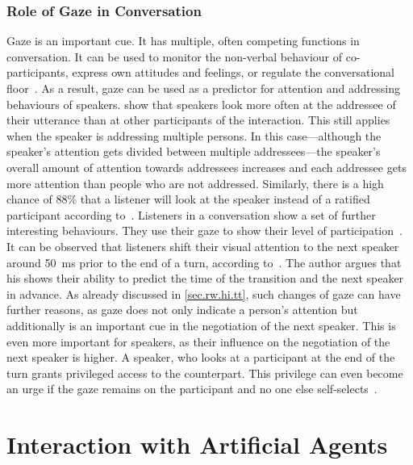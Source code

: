 \subsubsection{Role of Gaze in Conversation}\label{sec.rw.hi.gaze}

Gaze is an important  cue.
It has multiple, often competing functions in \gls{conversation}.
It can be used to monitor the non-verbal behaviour of co-participants, express own attitudes and feelings, or regulate the \gls{conversational floor}~\cite[]{Kendon1967}.
As a result, gaze can be used as a predictor for  attention and addressing behaviours of \glspl{speaker}.
 show that \glspl{speaker} look more often at the \gls{addressee} of their utterance than at other participants of the interaction.
This still applies when the \gls{speaker} is addressing multiple persons.
In this case---although the \gls{speaker}'s attention gets divided between multiple \glspl{addressee}---the \gls{speaker}'s overall amount of attention towards \glspl{addressee} increases and each \gls{addressee} gets more attention than people who are not addressed.
Similarly, there is a high chance of 88\% that a listener will look at the \gls{speaker} instead of a ratified participant according to~.
Listeners in a \gls{conversation} show a set of further interesting behaviours.
They use their gaze to show their level of participation~\cite[]{Auer2017}.
It can be observed that listeners shift their visual attention to the next \gls{speaker} around \SI{50}{\ms} prior to the end of a \gls{turn}, according to~.
The author argues that his shows their ability to predict the time of the transition and the next \gls{speaker} in advance.
As already discussed in \ref{sec.rw.hi.tt}, such changes of gaze can have further reasons, as gaze does not only indicate a person's attention but additionally is an important cue in the negotiation of the next \gls{speaker}.
This is even more important for \glspl{speaker}, as their influence on the negotiation of the next \gls{speaker} is higher.
A \gls{speaker}, who looks at a participant at the end of the \gls{turn} grants privileged access to the counterpart.
This privilege can even become an urge if the gaze remains on the participant and no one else self-selects~\cite[]{Auer2017}.

\section{Interaction with Artificial Agents}\label{sec.rw.hai}

